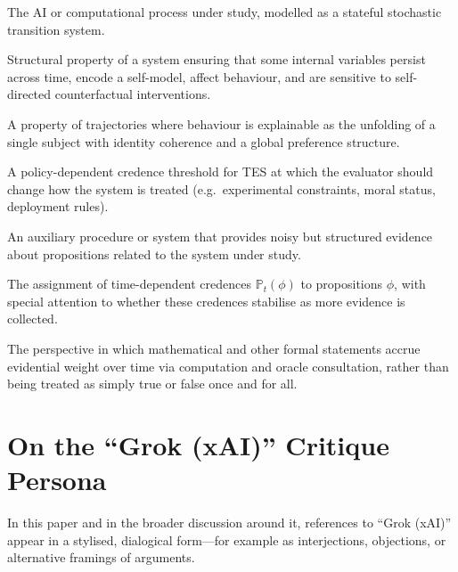 \documentclass[11pt]{article}
\newcommand{\Pp}{\mathbb{P}}
\newcommand{\1}{\mathbf{1}}
\begin{document}
\begin{description}[leftmargin=2em,style=nextline]
  \item[System $\mathcal{S}$] The AI or computational process under study,
  modelled as a stateful stochastic transition system.

  \item[Minimal Self Substrate (MSS)] Structural property of a system ensuring
  that some internal variables persist across time, encode a self-model,
  affect behaviour, and are sensitive to self-directed counterfactual
  interventions.

  \item[Time-Extended Self (TES)] A property of trajectories where behaviour
  is explainable as the unfolding of a single subject with identity coherence
  and a global preference structure.

  \item[Houk Threshold] A policy-dependent credence threshold for TES at which
  the evaluator should change how the system is treated (e.g.~experimental
  constraints, moral status, deployment rules).

  \item[Oracle] An auxiliary procedure or system that provides noisy but
  structured evidence about propositions related to the system under study.

  \item[Probabilistic truth] The assignment of time-dependent credences
  $\Pp_t(\phi)$ to propositions $\phi$, with special attention to whether
  these credences stabilise as more evidence is collected.

  \item[Mathematical Assertion Delay (MAD)] The perspective in which
  mathematical and other formal statements accrue evidential weight over
  time via computation and oracle consultation, rather than being treated as
  simply true or false once and for all.
\end{description}

\section{On the ``Grok (xAI)'' Critique Persona}\label{app:grok-persona}

In this paper and in the broader discussion around it, references to
\enquote{Grok (xAI)} appear in a stylised, dialogical form---for example as
interjections, objections, or alternative framings of arguments.
\end{document}
